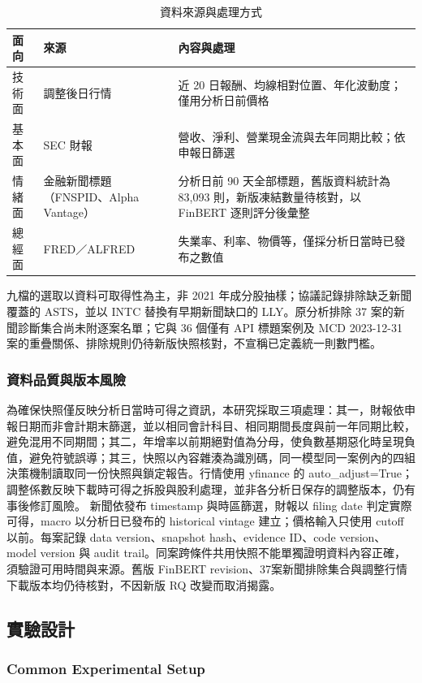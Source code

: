 \documentclass[12pt,a4paper]{article}
\begin{document}
\begin{CJK}{UTF8}{bkai}
\begin{table}[H]
\centering\small
\caption{資料來源與處理方式}
\label{tab:data}
\begin{tabularx}{\textwidth}{@{}l l Y@{}}
\toprule
面向 & 來源 & 內容與處理 \\
\midrule
技術面 & 調整後日行情 & 近 20 日報酬、均線相對位置、年化波動度；僅用分析日前價格 \\
基本面 & SEC 財報 & 營收、淨利、營業現金流與去年同期比較；依申報日篩選 \\
情緒面 & 金融新聞標題（FNSPID、Alpha Vantage） & 分析日前 90 天全部標題，舊版資料統計為 83,093 則，新版凍結數量待核對，以 FinBERT 逐則評分後彙整 \\
總經面 & FRED／ALFRED & 失業率、利率、物價等，僅採分析日當時已發布之數值 \\
\bottomrule
\end{tabularx}
\end{table}

九檔的選取以資料可取得性為主，非 2021 年成分股抽樣；協議記錄排除缺乏新聞覆蓋的 ASTS，並以 INTC 替換有早期新聞缺口的 LLY。原分析排除 37 案的新聞診斷集合尚未附逐案名單；它與 36 個僅有 API 標題案例及 MCD 2023-12-31 案的重疊關係、排除規則仍待新版快照核對，不宣稱已定義統一則數門檻。
\subsubsection{資料品質與版本風險}
為確保快照僅反映分析日當時可得之資訊，本研究採取三項處理：其一，財報依申報日期而非會計期末篩選，並以相同會計科目、相同期間長度與前一年同期比較，避免混用不同期間；其二，年增率以前期絕對值為分母，使負數基期惡化時呈現負值，避免符號誤導；其三，快照以內容雜湊為識別碼，同一模型同一案例內的四組決策機制讀取同一份快照與鎖定報告。行情使用 yfinance 的 auto\_adjust=True；調整係數反映下載時可得之拆股與股利處理，並非各分析日保存的調整版本，仍有事後修訂風險。
新聞依發布 timestamp 與時區篩選，財報以 filing date 判定實際可得，macro 以分析日已發布的 historical vintage 建立；價格輸入只使用 cutoff 以前。每案記錄 data version、snapshot hash、evidence ID、code version、model version 與 audit trail。同案跨條件共用快照不能單獨證明資料內容正確，須驗證可用時間與来源。舊版 FinBERT revision、37案新聞排除集合與調整行情下載版本均仍待核對，不因新版 RQ 改變而取消揭露。

\subsection{實驗設計}

\subsubsection{Common Experimental Setup}


\end{CJK}
\end{document}
